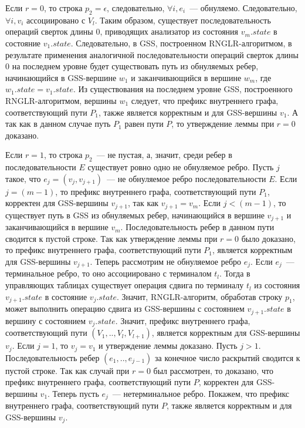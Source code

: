 Если $r = 0$, то строка $p_{2} = \epsilon$, следовательно, $\forall i, e_{i}$~--- обнуляемо. Следовательно, $\forall i, v_{i}$ ассоциировано с $V_{l}$. Таким образом, существует последовательность операций сверток длины 0, приводящих анализатор из состояния $v_{m}.state$ в состояние $v_{1}.state$. Следовательно, в GSS, построенном RNGLR-алгоритмом, в результате применения аналогичной последовательности операций сверток длины 0 на последнем уровне будет существовать путь из обнуляемых ребер, начинающийся в GSS-вершине $w_{1}$ и заканчивающийся в вершине $w_{m}$, где $w_{1}.state = v_{1}.state$. Из существования на последнем уровне GSS, построенного RNGLR-алгоритмом, вершины $w_{1}$ следует, что префикс внутреннего графа, соответствующий пути $P_{1}$, также является корректным и для GSS-вершины $v_{1}$. А так как в данном случае путь $P_{1}$ равен пути $P$, то утверждение леммы при $r = 0$ доказано.

Если $r = 1$, то строка $p_{2}$~--- не пустая, а, значит, среди ребер в последовательности $E$ существует ровно одно не обнуляемое ребро. Пусть $j$ такое, что $e_{j} = (v_{j}, v_{j+1})$~--- не обнуляемое ребро последовательности $E$. Если $j = (m - 1)$, то префикс внутреннего графа, соответствующий пути $P_{1}$, корректен для GSS-вершины $v_{j+1}$, так как $v_{j+1} = v_{m}$. Если $j < (m - 1)$, то существует путь в GSS из обнуляемых ребер, начинающийся в вершине $v_{j+1}$ и заканчивающийся в вершине $v_{m}$. Последовательность ребер в данном пути сводится к пустой строке. Так как утверждение леммы при $r = 0$ было доказано, то префикс внутреннего графа, соответствующий пути $P_{1}$, является корректным для GSS-вершины $v_{j+1}$. Теперь рассмотрим не обнуляемое ребро $e_{j}$. Если $e_{j}$~--- терминальное ребро, то оно ассоциировано с терминалом $t_{l}$. Тогда в управляющих таблицах существует операция сдвига по терминалу $t_{l}$ из состояния $v_{j+1}.state$ в состояние $v_{j}.state$. Значит, RNGLR-алгоритм, обработав строку $p_{1}$, может выполнить операцию сдвига из GSS-вершины с состоянием $v_{j+1}.state$ в вершину с состоянием $v_{j}.state$. Значит, префикс внутреннего графа, соответствующий пути $(V_{1},..,V_{l},V_{l+1})$, является корректным для GSS-вершины $v_{j}$. Если $j = 1$, то $v_{j} = v_{1}$ и утверждение леммы доказано. Пусть $j > 1$. Последовательность ребер $(e_{1},..,e_{j-1})$ за конечное число раскрытий сводится к пустой строке. Так как случай при $r = 0$ был рассмотрен, то доказано, что префикс внутреннего графа, соответствующий пути $P$, корректен для GSS-вершины $v_{1}$. Теперь пусть $e_{j}$~--- нетерминальное ребро. Покажем, что префикс внутреннего графа, соответствующий пути $P$, также является корректным и для GSS-вершины $v_{j}$. 

